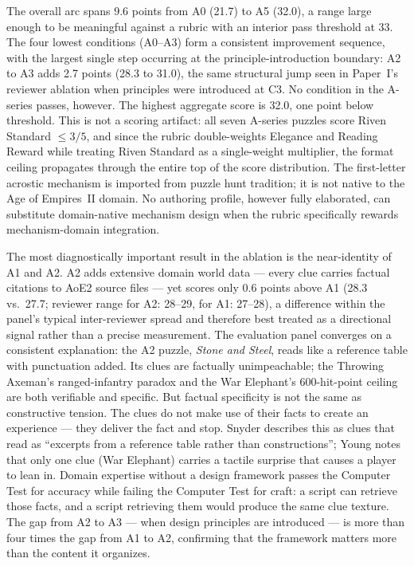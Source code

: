 The overall arc spans 9.6 points from A0 (21.7) to A5 (32.0), a range large enough to be meaningful against a rubric with an interior pass threshold at 33. The four lowest conditions (A0--A3) form a consistent improvement sequence, with the largest single step occurring at the principle-introduction boundary: A2 to A3 adds 2.7 points (28.3 to 31.0), the same structural jump seen in Paper~I's reviewer ablation when principles were introduced at C3. No condition in the A-series passes, however. The highest aggregate score is 32.0, one point below threshold. This is not a scoring artifact: all seven A-series puzzles score Riven Standard $\leq 3/5$, and since the rubric double-weights Elegance and Reading Reward while treating Riven Standard as a single-weight multiplier, the format ceiling propagates through the entire top of the score distribution. The first-letter acrostic mechanism is imported from puzzle hunt tradition; it is not native to the Age of Empires~II domain. No authoring profile, however fully elaborated, can substitute domain-native mechanism design when the rubric specifically rewards mechanism-domain integration.

The most diagnostically important result in the ablation is the near-identity of A1 and A2. A2 adds extensive domain world data --- every clue carries factual citations to AoE2 source files --- yet scores only 0.6 points above A1 (28.3 vs.\ 27.7; reviewer range for A2: 28--29, for A1: 27--28), a difference within the panel's typical inter-reviewer spread and therefore best treated as a directional signal rather than a precise measurement. The evaluation panel converges on a consistent explanation: the A2 puzzle, \textit{Stone and Steel}, reads like a reference table with punctuation added. Its clues are factually unimpeachable; the Throwing Axeman's ranged-infantry paradox and the War Elephant's 600-hit-point ceiling are both verifiable and specific. But factual specificity is not the same as constructive tension. The clues do not make use of their facts to create an experience --- they deliver the fact and stop. Snyder describes this as clues that read as ``excerpts from a reference table rather than constructions''; Young notes that only one clue (War Elephant) carries a tactile surprise that causes a player to lean in. Domain expertise without a design framework passes the Computer Test for accuracy while failing the Computer Test for craft: a script can retrieve those facts, and a script retrieving them would produce the same clue texture. The gap from A2 to A3 --- when design principles are introduced --- is more than four times the gap from A1 to A2, confirming that the framework matters more than the content it organizes.

